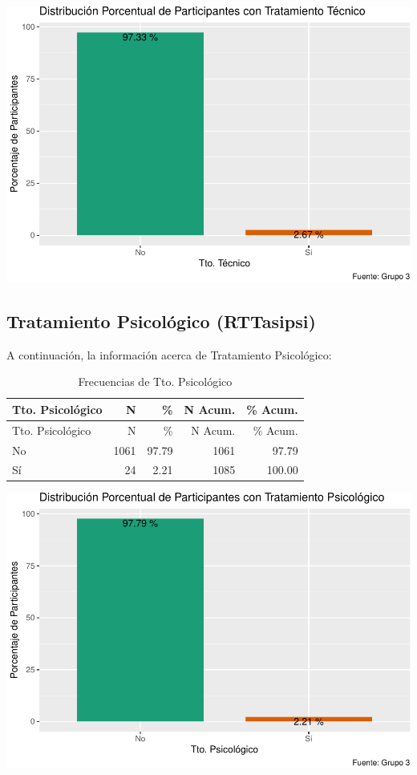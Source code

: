 \documentclass[
]{article}
\begin{document}
\includegraphics{Info_Dinix_02_files/figure-latex/30_RTT-1.pdf}

\subsection{Tratamiento Psicológico
(RTTasipsi)}\label{tratamiento-psicoluxf3gico-rttasipsi}

A continuación, la información acerca de Tratamiento Psicológico:

\begin{longtable}[]{@{}lrrrr@{}}
\caption{Frecuencias de Tto. Psicológico}\tabularnewline
\toprule\noalign{}
Tto. Psicológico & N & \% & N Acum. & \% Acum. \\
\midrule\noalign{}
\endfirsthead
\toprule\noalign{}
Tto. Psicológico & N & \% & N Acum. & \% Acum. \\
\midrule\noalign{}
\endhead
\bottomrule\noalign{}
\endlastfoot
No & 1061 & 97.79 & 1061 & 97.79 \\
Sí & 24 & 2.21 & 1085 & 100.00 \\
\end{longtable}

\includegraphics{Info_Dinix_02_files/figure-latex/30_RTTasipsi-1.pdf}
\end{document}

